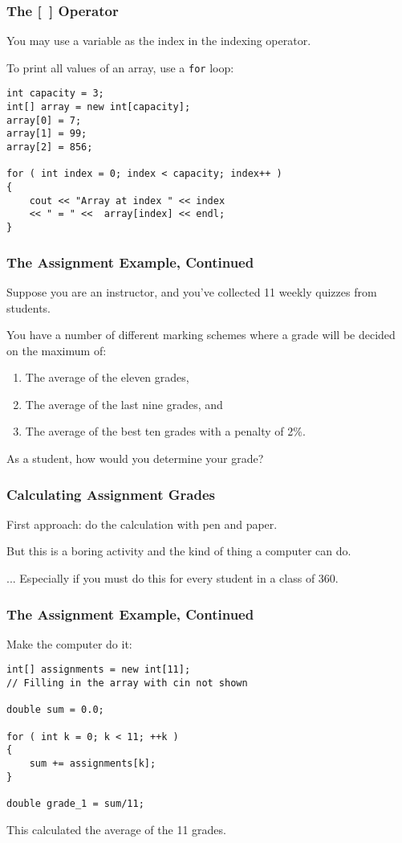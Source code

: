 \begin{frame}[fragile]
\frametitle{The [~] Operator}

You may use a variable as the index in the indexing operator.

To print all values of an array, use a \texttt{for} loop:

\begin{verbatim}
int capacity = 3;
int[] array = new int[capacity];
array[0] = 7;
array[1] = 99;
array[2] = 856;

for ( int index = 0; index < capacity; index++ )
{
    cout << "Array at index " << index 
    << " = " <<  array[index] << endl;
}
\end{verbatim}

\end{frame}

\begin{frame}
\frametitle{The Assignment Example, Continued}

Suppose you are an instructor, and you've collected 11 weekly quizzes from students.

You have a number of different marking schemes where a grade will be decided on the maximum of:
\begin{enumerate}
\item The average of the eleven grades,
\item The average of the last nine grades, and
\item The average of the best ten grades with a penalty of 2\%.
\end{enumerate}

As a student, how would you determine your grade? 

\end{frame}

\begin{frame}
\frametitle{Calculating Assignment Grades}
First approach: do the calculation with pen and paper.

But this is a boring activity and the kind of thing a computer can do.

... Especially if you must do this for every student in a class of 360.

\end{frame}

\begin{frame}[fragile]
\frametitle{The Assignment Example, Continued}
Make the computer do it:
\begin{verbatim}
int[] assignments = new int[11];
// Filling in the array with cin not shown

double sum = 0.0;

for ( int k = 0; k < 11; ++k )
{
    sum += assignments[k];
}

double grade_1 = sum/11;
\end{verbatim}

This calculated the average of the 11 grades.

\end{frame}

